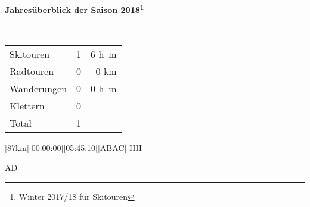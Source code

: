 \begin{center}{\Large \textbf{Jahres\"uberblick der Saison 2018\footnote{Winter 2017/18 f\"ur Skitouren}}} 

~

\begin{tabular}{lrr}
Skitouren & 1 & 6 \si{h\meter}\\
Radtouren & 0 & 0 \si{\kilo\meter}\\
Wanderungen & 0 & 0 \si{h\meter}\\
Klettern & 0&\\\hline
Total & 1 &
\end{tabular}\end{center}\newpage 
\begin{minipage}{\textwidth}[87km][00:00:00][05:45:10][ABAC]\label{2017-03-03-Test 3}
HH



 AD



\end{minipage}
